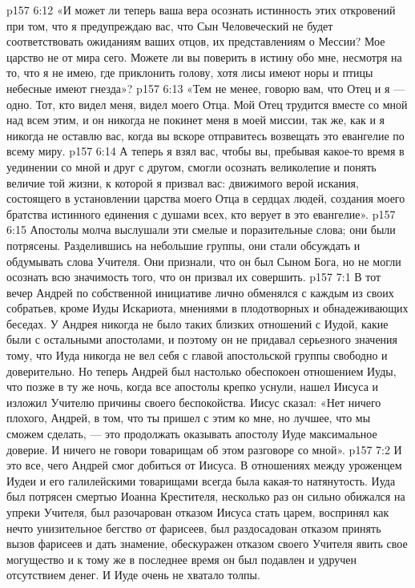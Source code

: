 \vs p157 6:12 \pc «И может ли теперь ваша вера осознать истинность этих откровений при том, что я предупреждаю вас, что Сын Человеческий не будет соответствовать ожиданиям ваших отцов, их представлениям о Мессии? Мое царство не от мира сего. Можете ли вы поверить в истину обо мне, несмотря на то, что я не имею, где приклонить голову, хотя лисы имеют норы и птицы небесные имеют гнезда»?
\vs p157 6:13 \pc «Тем не менее, говорю вам, что Отец и я --- одно. Тот, кто видел меня, видел моего Отца. Мой Отец трудится вместе со мной над всем этим, и он никогда не покинет меня в моей миссии, так же, как и я никогда не оставлю вас, когда вы вскоре отправитесь возвещать это евангелие по всему миру.
\vs p157 6:14 А теперь я взял вас, чтобы вы, пребывая какое\hyp{}то время в уединении со мной и друг с другом, смогли осознать великолепие и понять величие той жизни, к которой я призвал вас: движимого верой искания, состоящего в установлении царства моего Отца в сердцах людей, создания моего братства истинного единения с душами всех, кто верует в это евангелие».
\vs p157 6:15 \pc Апостолы молча выслушали эти смелые и поразительные слова; они были потрясены. Разделившись на небольшие группы, они стали обсуждать и обдумывать слова Учителя. Они признали, что он был Сыном Бога, но не могли осознать всю значимость того, что он призвал их совершить.
\vs p157 7:1 В тот вечер Андрей по собственной инициативе лично обменялся с каждым из своих собратьев, кроме Иуды Искариота, мнениями в плодотворных и обнадеживающих беседах. У Андрея никогда не было таких близких отношений с Иудой, какие были с остальными апостолами, и поэтому он не придавал серьезного значения тому, что Иуда никогда не вел себя с главой апостольской группы свободно и доверительно. Но теперь Андрей был настолько обеспокоен отношением Иуды, что позже в ту же ночь, когда все апостолы крепко уснули, нашел Иисуса и изложил Учителю причины своего беспокойства. Иисус сказал: «Нет ничего плохого, Андрей, в том, что ты пришел с этим ко мне, но лучшее, что мы сможем сделать, --- это продолжать оказывать апостолу Иуде максимальное доверие. И ничего не говори товарищам об этом разговоре со мной».
\vs p157 7:2 И это все, чего Андрей смог добиться от Иисуса. В отношениях между уроженцем Иудеи и его галилейскими товарищами всегда была какая\hyp{}то натянутость. Иуда был потрясен смертью Иоанна Крестителя, несколько раз он сильно обижался на упреки Учителя, был разочарован отказом Иисуса стать царем, воспринял как нечто унизительное бегство от фарисеев, был раздосадован отказом принять вызов фарисеев и дать знамение, обескуражен отказом своего Учителя явить свое могущество и к тому же в последнее время он был подавлен и удручен отсутствием денег. И Иуде очень не хватало толпы.
